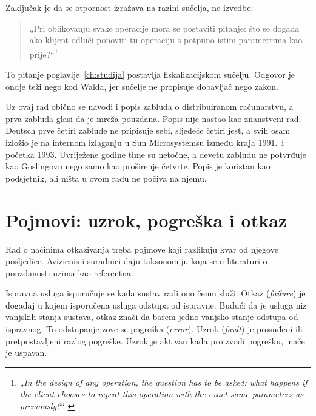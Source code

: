 Zaključak je da se otpornost izražava na razini sučelja, ne izvedbe:

\begin{quote}
„Pri oblikovanju svake operacije mora se postaviti pitanje: što se događa
ako klijent odluči ponoviti tu operaciju s potpuno istim parametrima kao
prije?“\footnote{„\emph{In the design of any operation, the question has
to be asked: what happens if the client chooses to repeat this operation
with the exact same parameters as previously?}“ \cite{waldo1994note}}
\end{quote}

To pitanje poglavlje~\ref{ch:studija} postavlja fiskalizacijskom sučelju.
Odgovor je ondje teži nego kod Walda, jer sučelje ne propisuje dobavljač
nego zakon.

Uz ovaj rad obično se navodi i popis zabluda o distribuiranom računarstvu,
a prva zabluda glasi da je mreža pouzdana. Popis nije nastao kao znanstveni
rad. Deutsch prve četiri zablude ne pripisuje sebi, sljedeće četiri jest, a
svih osam izložio je na internom izlaganju u Sun Microsystemsu između kraja
1991.\ i početka 1993. Uvriježene godine time su netočne, a devetu zabludu
ne potvrđuje kao Goslingovu nego samo kao proširenje
četvrte\cite{deutsch2021fallacies}. Popis je koristan kao podsjetnik, ali
ništa u ovom radu ne počiva na njemu.

\section{Pojmovi: uzrok, pogreška i otkaz}
\label{sec:fault-error-failure}
%

Rad o načinima otkazivanja treba pojmove koji razlikuju kvar od njegove
posljedice. Avizienis i suradnici daju taksonomiju koja se u literaturi o
pouzdanosti uzima kao referentna\cite{avizienis2004taxonomy}.

Ispravna usluga isporučuje se kada sustav radi ono čemu služi. Otkaz
(\emph{failure}) je događaj u kojem isporučena usluga odstupa od ispravne.
Budući da je usluga niz vanjskih stanja sustava, otkaz znači da barem
jedno vanjsko stanje odstupa od ispravnog. To odstupanje zove se pogreška
(\emph{error}). Uzrok (\emph{fault}) je prosuđeni ili pretpostavljeni
razlog pogreške. Uzrok je aktivan kada proizvodi pogrešku, inače je
uspavan.

